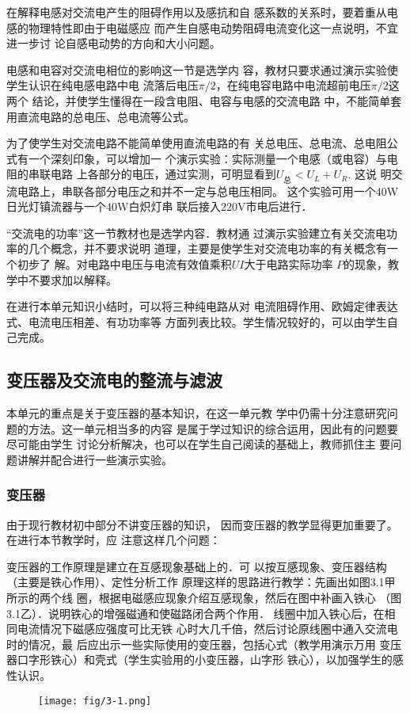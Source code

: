 在解释电感对交流电产生的阻碍作用以及感抗和自
感系数的关系时，要着重从电感的物理特性即由于电磁感应
而产生自感电动势阻碍电流变化这一点说明，不宜进一步讨
论自感电动势的方向和大小问题。

电感和电容对交流电相位的影响这一节是选学内
容，教材只要求通过演示实验使学生认识在纯电感电路中电
流落后电压$\pi/2$，在纯电容电路中电流超前电压$\pi/2$这两个
结论，并使学生懂得在一段含电阻、电容与电感的交流电路
中，不能简单套用直流电路的总电压、总电流等公式。

为了使学生对交流电路不能简单使用直流电路的有
关总电压、总电流、总电阻公式有一个深刻印象，可以增加一
个演示实验：实际测量一个电感（或电容）与电阻的串联电路
上各部分的电压，通过实测，可明显看到$U_{\text{总}}<U_L+U_R$. 这说
明交流电路上，串联各部分电压之和并不一定与总电压相同。
这个实验可用一个40W日光灯镇流器与一个40W白炽灯串
联后接入220V市电后进行．

“交流电的功率”这一节教材也是选学内容．教材通
过演示实验建立有关交流电功率的几个概念，并不要求说明
道理，主要是使学生对交流电功率的有关概念有一个初步了
解。对电路中电压与电流有效值乘积$UI$大于电路实际功率
$P$的现象，教学中不要求加以解释。

在进行本单元知识小结时，可以将三种纯电路从对
电流阻碍作用、欧姆定律表达式、电流电压相差、有功功率等
方面列表比较。学生情况较好的，可以由学生自己完成。


\subsection{变压器及交流电的整流与滤波}
本单元的重点是关于变压器的基本知识，在这一单元教
学中仍需十分注意研究问题的方法。这一单元相当多的内容
是属于学过知识的综合运用，因此有的问题要尽可能由学生
讨论分析解决，也可以在学生自己阅读的基础上，教师抓住主
要问题讲解并配合进行一些演示实验。

\subsubsection{变压器}
由于现行教材初中部分不讲变压器的知识，
因而变压器的教学显得更加重要了。在进行本节教学时，应
注意这样几个问题：

变压器的工作原理是建立在互感现象基础上的．可
以按互感现象、变压器结构（主要是铁心作用）、定性分析工作
原理这样的思路进行教学：先画出如图3.1甲所示的两个线
圈，根据电磁感应现象介绍互感现象，然后在图中补画入铁心
（图3.1乙）．说明铁心的增强磁通和使磁路闭合两个作用．
线圈中加入铁心后，在相同电流情况下磁感应强度可比无铁
心时大几千倍，然后讨论原线圈中通入交流电时的情况，最
后应出示一些实际使用的变压器，包括心式（教学用演示万用
变压器口字形铁心）和壳式（学生实验用的小变压器，山字形
铁心），以加强学生的感性认识。
\begin{figure}[htp]
    \centering
\texttt{[image: fig/3-1.png]}
    \caption{}
\end{figure}

